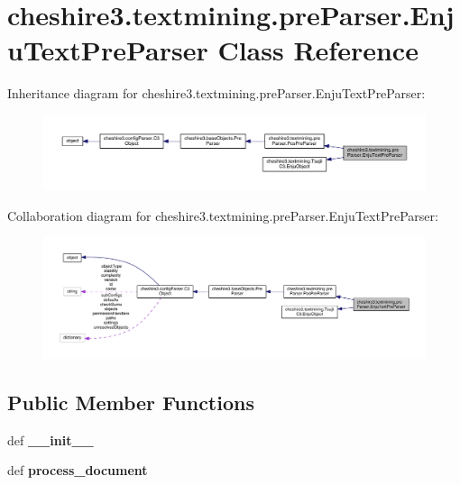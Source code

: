 \hypertarget{classcheshire3_1_1textmining_1_1pre_parser_1_1_enju_text_pre_parser}{\section{cheshire3.\-textmining.\-pre\-Parser.\-Enju\-Text\-Pre\-Parser Class Reference}
\label{classcheshire3_1_1textmining_1_1pre_parser_1_1_enju_text_pre_parser}
}


Inheritance diagram for cheshire3.\-textmining.\-pre\-Parser.\-Enju\-Text\-Pre\-Parser\-:
\nopagebreak
\begin{figure}[H]
\begin{center}
\leavevmode
\includegraphics[width=350pt]{classcheshire3_1_1textmining_1_1pre_parser_1_1_enju_text_pre_parser__inherit__graph}
\end{center}
\end{figure}


Collaboration diagram for cheshire3.\-textmining.\-pre\-Parser.\-Enju\-Text\-Pre\-Parser\-:
\nopagebreak
\begin{figure}[H]
\begin{center}
\leavevmode
\includegraphics[width=350pt]{classcheshire3_1_1textmining_1_1pre_parser_1_1_enju_text_pre_parser__coll__graph}
\end{center}
\end{figure}
\subsection*{Public Member Functions}
\begin{DoxyCompactItemize}
\item 
\hypertarget{classcheshire3_1_1textmining_1_1pre_parser_1_1_enju_text_pre_parser_a6f4b09c833c7e48c4d4622ced9f7cb76}{def {\bfseries \-\_\-\-\_\-init\-\_\-\-\_\-}}\label{classcheshire3_1_1textmining_1_1pre_parser_1_1_enju_text_pre_parser_a6f4b09c833c7e48c4d4622ced9f7cb76}

\item 
\hypertarget{classcheshire3_1_1textmining_1_1pre_parser_1_1_enju_text_pre_parser_ab55e19698482510ef4a9e65492e0fabe}{def {\bfseries process\-\_\-document}}\label{classcheshire3_1_1textmining_1_1pre_parser_1_1_enju_text_pre_parser_ab55e19698482510ef4a9e65492e0fabe}

\end{DoxyCompactItemize}
